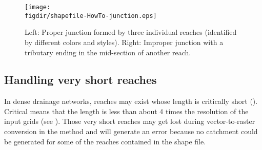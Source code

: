 \begin{figure}
  \centering
  \texttt{[image: \\figdir/shapefile-HowTo-junction.eps]}
  \caption[Proper and improper junctions in a shape file.]{Left: Proper junction formed by three individual reaches (identified by different colors and styles). Right: Improper junction with a tributary ending in the mid-section of another reach. \label{fig:shapefile-HowTo-junction}}
\end{figure}

\subsection{Handling very short reaches} \label{sec:topocatch:hints-shortReach}
In dense drainage networks, reaches may exist whose length is critically short (). Critical means that the length is less than about 4 times the resolution of the input grids (see ). Those very short reaches may get lost during vector-to-raster conversion in the  method and  will generate an error because no catchment could be generated for some of the reaches contained in the shape file.

